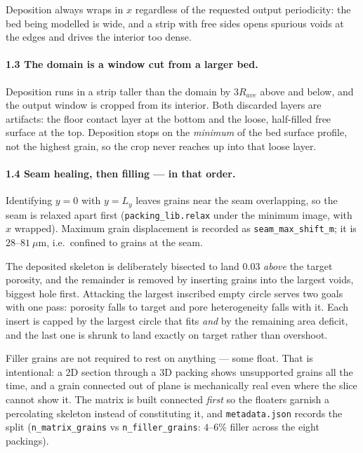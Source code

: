 \documentclass[11pt]{article}
\newcommand{\code}[1]{\texttt{\small #1}}
\begin{document}
Deposition always wraps in $x$ regardless of the requested output
periodicity: the bed being modelled is wide, and a strip with free sides
opens spurious voids at the edges and drives the interior too dense.

\paragraph{1.3 The domain is a window cut from a larger bed.}
Deposition runs in a strip taller than the domain by
$3 R_{ave}$ above and below, and the output window is cropped from its
interior. Both discarded layers are artifacts: the floor contact layer at
the bottom and the loose, half-filled free surface at the top. Deposition
stops on the \emph{minimum} of the bed surface profile, not the highest
grain, so the crop never reaches up into that loose layer.

\paragraph{1.4 Seam healing, then filling --- in that order.}
Identifying $y=0$ with $y=L_y$ leaves grains near the seam overlapping, so
the seam is relaxed apart first (\code{packing\_lib.relax} under the
minimum image, with $x$ wrapped). Maximum grain displacement is recorded as
\code{seam\_max\_shift\_m}; it is $28$--$81\ \mu$m, i.e.\ confined to grains
at the seam.

The deposited skeleton is deliberately bisected to land $0.03$ \emph{above}
the target porosity, and the remainder is removed by inserting grains into
the largest voids, biggest hole first. Attacking the largest inscribed
empty circle serves two goals with one pass: porosity falls to target and
pore heterogeneity falls with it. Each insert is capped by the largest
circle that fits \emph{and} by the remaining area deficit, and the last one
is shrunk to land exactly on target rather than overshoot.

Filler grains are not required to rest on anything --- some float. That is
intentional: a 2D section through a 3D packing shows unsupported grains all
the time, and a grain connected out of plane is mechanically real even
where the slice cannot show it. The matrix is built connected \emph{first}
so the floaters garnish a percolating skeleton instead of constituting it,
and \code{metadata.json} records the split (\code{n\_matrix\_grains} vs
\code{n\_filler\_grains}: $4$--$6\%$ filler across the eight packings).
\end{document}
